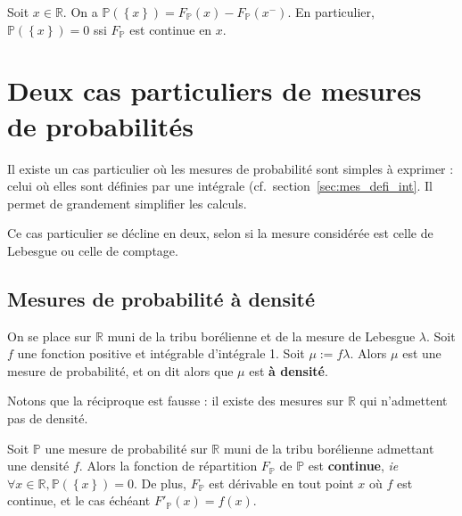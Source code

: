 \documentclass[../integ-proba.tex]{subfiles}
\begin{document}
    \begin{cor}
        Soit $x \in \mathbb{R}$.
        On a $\mathbb{P}(\left\{x\right\}) = F_\mathbb{P}(x) - F_\mathbb{P}(x^-)$.
        En particulier, $\mathbb{P}(\left\{x\right\}) = 0$ ssi $F_\mathbb{P}$ est continue en $x$.
    \end{cor}

    \section{Deux cas particuliers de mesures de probabilités}
    \label{sec:probas_mes_particulieres}

    Il existe un cas particulier où les mesures de probabilité sont simples à exprimer : celui où elles sont définies par une intégrale (cf.\ section~\ref{sec:mes_defi_int}.
    Il permet de grandement simplifier les calculs.

    Ce cas particulier se décline en deux, selon si la mesure considérée est celle de Lebesgue ou celle de comptage.

        \subsection{Mesures de probabilité à densité}
            \begin{defi}
                On se place sur $\mathbb{R}$ muni de la tribu borélienne et de la mesure de Lebesgue $\lambda$.
                Soit $f$ une fonction positive et intégrable d'intégrale 1.
                Soit $\mu:=f \lambda$.
                Alors $\mu$ est une mesure de probabilité, et on dit alors que $\mu$ est \textbf{à densité}.
            \end{defi}

            \begin{rem}
                Notons que la réciproque est fausse : il existe des mesures sur $\mathbb{R}$ qui n'admettent pas de densité.
            \end{rem}

    \begin{prop}
        Soit $\mathbb{P}$ une mesure de probabilité sur $\mathbb{R}$ muni de la tribu borélienne admettant une densité $f$.
        Alors la fonction de répartition $F_\mathbb{P}$ de $\mathbb{P}$ est \textbf{continue}, \textit{ie} $\forall x \in \mathbb{R}, \mathbb{P}(\left\{ x \right\}) = 0$.
        De plus, $F_\mathbb{P}$ est dérivable en tout point $x$ où $f$ est continue, et le cas échéant $F'_\mathbb{P}(x) = f(x)$.
    \end{prop}
\end{document}
